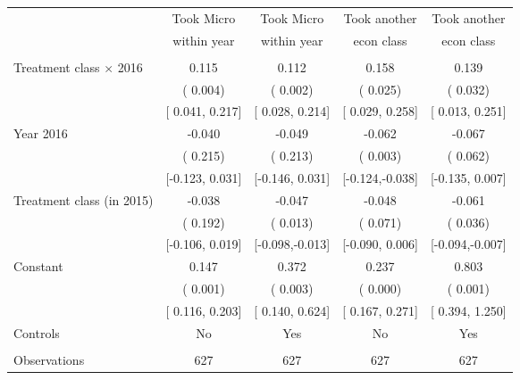 \begin{tabular}{lcccc} \toprule
& Took Micro & Took Micro & Took another & Took another\tabularnewline
& within year  & within year  & econ class  & econ class \tabularnewline
\midrule &  &  &  & \tabularnewline
Treatment class $\times$ 2016 &  0.115 &  0.112 &  0.158 &  0.139\tabularnewline
& ( 0.004) & ( 0.002) & ( 0.025) & ( 0.032)\tabularnewline
& {[} 0.041, 0.217{]} & {[} 0.028, 0.214{]} & {[} 0.029, 0.258{]} & {[} 0.013, 0.251{]}\tabularnewline
Year 2016  & -0.040 & -0.049 & -0.062 & -0.067\tabularnewline
& ( 0.215) & ( 0.213) & ( 0.003) & ( 0.062)\tabularnewline
& {[}-0.123, 0.031{]} & {[}-0.146, 0.031{]} & {[}-0.124,-0.038{]} & {[}-0.135, 0.007{]}\tabularnewline
Treatment class (in 2015) & -0.038 & -0.047 & -0.048 & -0.061\tabularnewline
& ( 0.192) & ( 0.013) & ( 0.071) & ( 0.036)\tabularnewline
& {[}-0.106, 0.019{]} & {[}-0.098,-0.013{]} & {[}-0.090, 0.006{]} & {[}-0.094,-0.007{]}\tabularnewline
Constant  &  0.147 &  0.372 &  0.237 &  0.803\tabularnewline
& ( 0.001) & ( 0.003) & ( 0.000) & ( 0.001)\tabularnewline
& {[} 0.116, 0.203{]} & {[} 0.140, 0.624{]} & {[} 0.167, 0.271{]} & {[} 0.394, 1.250{]}\tabularnewline
Controls & No & Yes & No & Yes\tabularnewline
&  &  &  & \tabularnewline
Observations & 627 & 627 & 627 & 627\tabularnewline
\bottomrule \bottomrule
\end{tabular}
